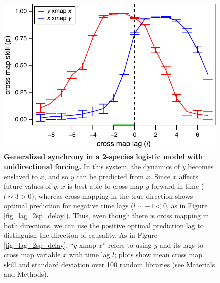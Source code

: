 \begin{figure}[!ht]
\begin{center}\includegraphics[width=\maxwidth{\textwidth}]{fig_lag_2sp_synch.pdf}\end{center}
\caption[Generalized synchrony in a 2-species logistic model with unidirectional forcing.]{\textbf{Generalized synchrony in a 2-species logistic model with unidirectional forcing.}\newline
In this system, the dynamics of $y$ becomes enslaved to $x$, and so $y$ can be predicted from $x$. Since $x$ affects future values of $y$, $x$ is best able to cross map $y$ forward in time ($l \sim 3 > 0$), whereas cross mapping in the true direction shows optimal prediction for negative time lags ($l \sim -1 < 0$, as in Figure \ref{fig_lag_2sp_delay}). Thus, even though there is cross mapping in both directions, we can use the positive optimal prediction lag to distinguish the direction of causality. As in Figure \ref{fig_lag_2sp_delay}, ``$y$ xmap $x$'' refers to using $y$ and its lags to cross map variable $x$ with time lag $l$; plots show mean cross map skill and standard deviation over 100 random libraries (see Materials and Methods).}
\label{fig_lag_2sp_synch}
\end{figure}

